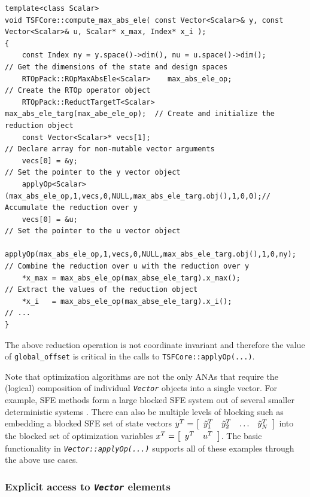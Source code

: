 {\tiny\begin{verbatim}
template<class Scalar>
void TSFCore::compute_max_abs_ele( const Vector<Scalar>& y, const Vector<Scalar>& u, Scalar* x_max, Index* x_i );
{
    const Index ny = y.space()->dim(), nu = u.space()->dim();            // Get the dimensions of the state and design spaces
    RTOpPack::ROpMaxAbsEle<Scalar>    max_abs_ele_op;                    // Create the RTOp operator object
    RTOpPack::ReductTargetT<Scalar>   max_abs_ele_targ(max_abe_ele_op);  // Create and initialize the reduction object
    const Vector<Scalar>* vecs[1];                                       // Declare array for non-mutable vector arguments
    vecs[0] = &y;                                                        // Set the pointer to the y vector object
    applyOp<Scalar>(max_abs_ele_op,1,vecs,0,NULL,max_abs_ele_targ.obj(),1,0,0);// Accumulate the reduction over y
    vecs[0] = &u;                                                        // Set the pointer to the u vector object
    applyOp(max_abs_ele_op,1,vecs,0,NULL,max_abs_ele_targ.obj(),1,0,ny); // Combine the reduction over u with the reduction over y
    *x_max = max_abs_ele_op(max_abse_ele_targ).x_max();                  // Extract the values of the reduction object
    *x_i   = max_abs_ele_op(max_abse_ele_targ).x_i();                    // ...
}
\end{verbatim}}

The above reduction operation is not coordinate invariant and
therefore the value of \texttt{global\_offset} is critical in the
calls to \texttt{TSFCore\-::applyOp(\-...)}.

Note that optimization algorithms are not the only ANAs that require
the (logical) composition of individual \texttt{\textit{Vector}}
objects into a single vector.  For example, SFE methods form a large
blocked SFE system out of several smaller deterministic systems
\cite{ref:sfe}.  There can also be multiple levels of blocking such as
embedding a blocked SFE set of state vectors $y^T = \bmat{cccc}
\tilde{y}_1^T & \tilde{y}_2^T & \ldots & \tilde{y}_N^T \emat$ into the blocked set of
optimization variables $x^T = \bmat{cc} y^T & u^T \emat$.  The basic
functionality in \texttt{\textit{Vector\-::applyOp(\-...)}} supports
all of these examples through the above use cases.

%
\subsubsection{Explicit access to \texttt{\textit{Vector}} elements}
%

